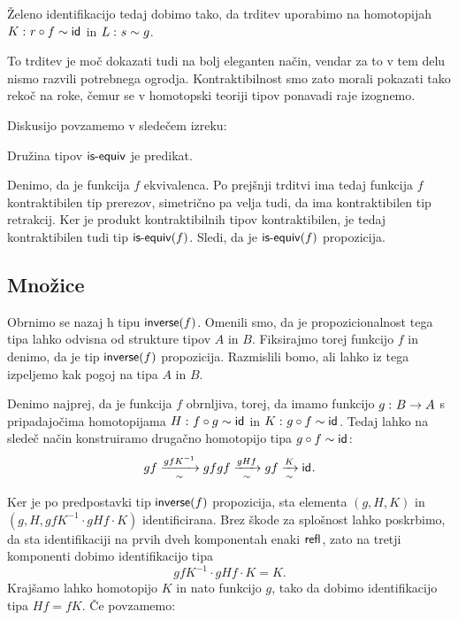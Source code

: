 \begin{dokaz}
\begin{enumerate}
Želeno identifikacijo tedaj dobimo tako, da trditev uporabimo na homotopijah \(K \,\colon r \circ f \sim \textnormal{\textsf{id}}_{}\) in \(L \,\colon s \sim g\).
\end{enumerate}
\end{dokaz}

To trditev je moč dokazati tudi na bolj eleganten način, vendar za to v tem delu nismo razvili potrebnega ogrodja. Kontraktibilnost smo zato morali pokazati tako rekoč na roke, čemur se v homotopski teoriji tipov ponavadi raje izognemo.

Diskusijo povzamemo v sledečem izreku:

\begin{izrek}
  \label{is-equiv-prop}
  Družina tipov \(\textnormal{\textsf{is-equiv}}\) je predikat.
\end{izrek}

\begin{dokaz}
  Denimo, da je funkcija \(f\) ekvivalenca. Po prejšnji trditvi ima tedaj funkcija \(f\) kontraktibilen tip prerezov, simetrično pa velja tudi, da ima kontraktibilen tip retrakcij. Ker je produkt kontraktibilnih tipov kontraktibilen, je tedaj kontraktibilen tudi tip \(\textnormal{\textsf{is-equiv}}(f)\). Sledi, da je \(\textnormal{\textsf{is-equiv}}(f)\) propozicija.
\end{dokaz}

\subsection{Množice}

Obrnimo se nazaj h tipu \(\textnormal{\textsf{inverse}}(f)\). Omenili smo, da je propozicionalnost tega tipa lahko odvisna od strukture tipov \(A\) in \(B\). Fiksirajmo torej funkcijo \(f\) in denimo, da je tip \(\textnormal{\textsf{inverse}}(f)\) propozicija. Razmislili bomo, ali lahko iz tega izpeljemo kak pogoj na tipa \(A\) in \(B\).

Denimo najprej, da je funkcija \(f\) obrnljiva, torej, da imamo funkcijo \(g \,\colon B \to A\) s pripadajočima homotopijama \(H \,\colon f \circ g \sim \textnormal{\textsf{id}}_{}\) in \(K \,\colon g \circ f \sim \textnormal{\textsf{id}}_{}\). Tedaj lahko na sledeč način konstruiramo drugačno homotopijo tipa \(g \circ f \sim \textnormal{\textsf{id}}_{}\):
\[gf \xrightarrow[\sim]{gfK^{-1}} gfgf \xrightarrow[\sim]{gHf} gf \xrightarrow[\sim]{K} \textnormal{\textsf{id}}_{}.\]

Ker je po predpostavki tip \(\textnormal{\textsf{inverse}}(f)\) propozicija, sta elementa \((g, H, K)\)
in \((g, H, gfK^{-1} \cdot gHf \cdot K)\) identificirana. Brez škode za splošnost lahko poskrbimo, da sta identifikaciji na prvih dveh komponentah enaki \(\textnormal{\textsf{refl}}_{}\), zato na tretji komponenti dobimo identifikacijo tipa \[gfK^{-1} \cdot gHf \cdot K = K.\]
Krajšamo lahko homotopijo \(K\) in nato funkcijo \(g\), tako da dobimo identifikacijo tipa \(Hf = fK\). Če povzamemo:

